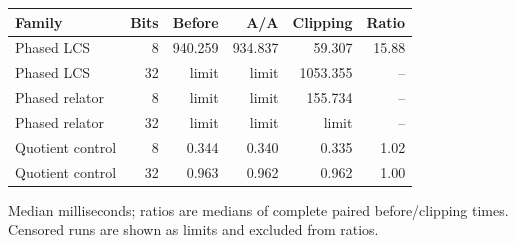 \begin{center}\small
\begin{tabular}{@{}lrrrrr@{}}
\toprule
Family & Bits & Before & A/A & Clipping & Ratio \\
\midrule
Phased LCS & 8 & 940.259 & 934.837 & 59.307 & 15.88 \\
Phased LCS & 32 & limit & limit & 1053.355 & -- \\
Phased relator & 8 & limit & limit & 155.734 & -- \\
Phased relator & 32 & limit & limit & limit & -- \\
Quotient control & 8 & 0.344 & 0.340 & 0.335 & 1.02 \\
Quotient control & 32 & 0.963 & 0.962 & 0.962 & 1.00 \\
\bottomrule
\end{tabular}
\end{center}
Median milliseconds; ratios are medians of complete paired before/clipping times. Censored runs are shown as limits and excluded from ratios.
